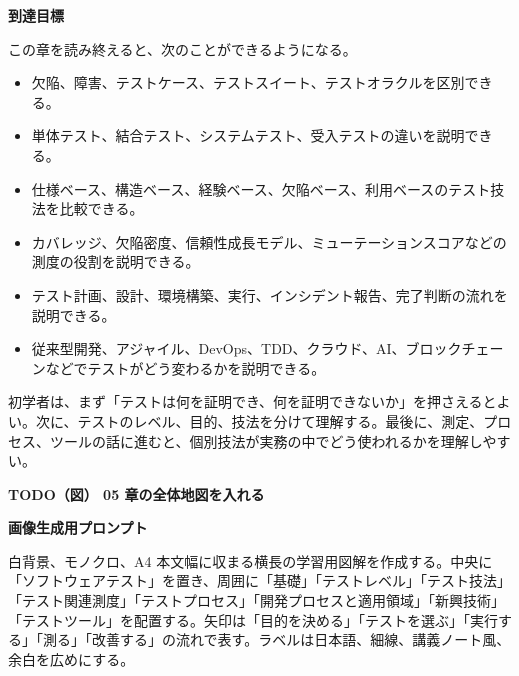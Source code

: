 \documentclass[uplatex,dvipdfmx,a4paper,11pt,nomag]{jsarticle}
\newenvironment{pointbox}[1]{\par\medskip\begin{shaded}\noindent\textbf{#1}\par\smallskip\noindent}{\end{shaded}\par\medskip}
\newenvironment{todobox}[2]{\par\medskip\begin{framed}\noindent\textbf{TODO（図） #1}\par\smallskip\noindent\textbf{画像生成用プロンプト}\par\smallskip\noindent #2\par\smallskip}{\end{framed}\par\medskip}
\begin{document}
\begin{pointbox}{到達目標}
この章を読み終えると、次のことができるようになる。
\begin{itemize}[leftmargin=2em]
  \item 欠陥、障害、テストケース、テストスイート、テストオラクルを区別できる。
  \item 単体テスト、結合テスト、システムテスト、受入テストの違いを説明できる。
  \item 仕様ベース、構造ベース、経験ベース、欠陥ベース、利用ベースのテスト技法を比較できる。
  \item カバレッジ、欠陥密度、信頼性成長モデル、ミューテーションスコアなどの測度の役割を説明できる。
  \item テスト計画、設計、環境構築、実行、インシデント報告、完了判断の流れを説明できる。
  \item 従来型開発、アジャイル、DevOps、TDD、クラウド、AI、ブロックチェーンなどでテストがどう変わるかを説明できる。
\end{itemize}
\end{pointbox}

初学者は、まず「テストは何を証明でき、何を証明できないか」を押さえるとよい。次に、テストのレベル、目的、技法を分けて理解する。最後に、測定、プロセス、ツールの話に進むと、個別技法が実務の中でどう使われるかを理解しやすい。

\begin{todobox}{05 章の全体地図を入れる}{白背景、モノクロ、A4 本文幅に収まる横長の学習用図解を作成する。中央に「ソフトウェアテスト」を置き、周囲に「基礎」「テストレベル」「テスト技法」「テスト関連測度」「テストプロセス」「開発プロセスと適用領域」「新興技術」「テストツール」を配置する。矢印は「目的を決める」「テストを選ぶ」「実行する」「測る」「改善する」の流れで表す。ラベルは日本語、細線、講義ノート風、余白を広めにする。}
\end{todobox}
\end{document}
